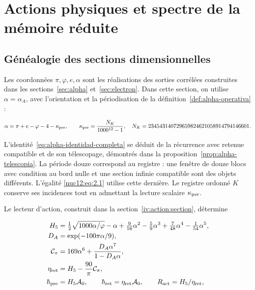 \section{Actions physiques et spectre de la mémoire réduite
}
\label{nuclear:12}
\subsection{Généalogie des sections dimensionnelles
}

Les coordonnées \(\pi,\varphi,e,\alpha\) sont les réalisations des sorties corrélées construites dans les sections~\ref{sec:alpha} et~\ref{sec:electron}. Dans cette section, on utilise \(\alpha=\alpha_A\), avec l’orientation et la périodisation de la définition~\ref{def:alpha-operativa} :




\begin{equation}
\alpha=\pi+e-\varphi-4-\kappa_{\rm per},\qquad
\kappa_{\rm per}=\frac{N_K}{1000^{12}-1},
\quad N_K=234543140729659824621058914794146601.
\label{nuc12:eq:2.1}
\end{equation}



L’identité~\eqref{eq:alpha-identidad-completa} se déduit de la récurrence avec retenue compatible et de son télescopage, démontrés dans la proposition~\ref{prop:alpha-telescopia}. La période douze correspond au registre : une fenêtre de douze blocs avec condition au bord nulle et une section infinie compatible sont des objets différents. L’égalité \eqref{nuc12:eq:2.1} utilise cette dernière. Le registre ordonné \(K\) conserve ses incidences tout en admettant la lecture scalaire \(\kappa_{\rm per}\).

Le lecteur d’action, construit dans la section~\ref{iv:action:section}, détermine




\begin{equation}
\begin{aligned}
H_5&=\tfrac12\sqrt{1000\alpha/\varphi}-\alpha+
\tfrac9{16}\alpha^2-\tfrac59\alpha^3+
\tfrac7{48}\alpha^4-\tfrac1{54}\alpha^5,\\
D_A&=\exp(-100\pi\alpha/9),\\
\mathcal C_\pi&=169\alpha^6+\frac{D_A\alpha^7}{1-D_A\alpha},\\
\eta_{\rm ret}&=H_5-\frac{90}{\pi}\mathcal C_\pi,\\
\hbar_{\rm pre}&=H_5\mathcal A_0,\qquad
\hbar_{\rm ret}=\eta_{\rm ret}\mathcal A_0,\qquad
R_{\rm act}=H_5/\eta_{\rm ret},
\end{aligned}
\label{nuc12:eq:2.2}
\end{equation}



